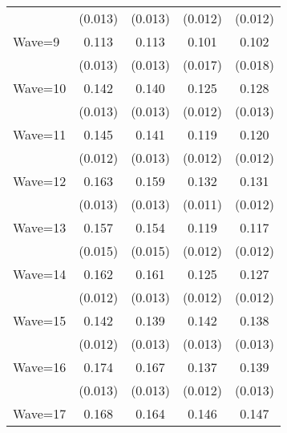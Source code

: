 {\begin{tabular}{l*{4}{c}}
                    &     (0.013)         &     (0.013)         &     (0.012)         &     (0.012)         \\
Wave=9              &       0.113\sym{***}&       0.113\sym{***}&       0.101\sym{***}&       0.102\sym{***}\\
                    &     (0.013)         &     (0.013)         &     (0.017)         &     (0.018)         \\
Wave=10             &       0.142\sym{***}&       0.140\sym{***}&       0.125\sym{***}&       0.128\sym{***}\\
                    &     (0.013)         &     (0.013)         &     (0.012)         &     (0.013)         \\
Wave=11             &       0.145\sym{***}&       0.141\sym{***}&       0.119\sym{***}&       0.120\sym{***}\\
                    &     (0.012)         &     (0.013)         &     (0.012)         &     (0.012)         \\
Wave=12             &       0.163\sym{***}&       0.159\sym{***}&       0.132\sym{***}&       0.131\sym{***}\\
                    &     (0.013)         &     (0.013)         &     (0.011)         &     (0.012)         \\
Wave=13             &       0.157\sym{***}&       0.154\sym{***}&       0.119\sym{***}&       0.117\sym{***}\\
                    &     (0.015)         &     (0.015)         &     (0.012)         &     (0.012)         \\
Wave=14             &       0.162\sym{***}&       0.161\sym{***}&       0.125\sym{***}&       0.127\sym{***}\\
                    &     (0.012)         &     (0.013)         &     (0.012)         &     (0.012)         \\
Wave=15             &       0.142\sym{***}&       0.139\sym{***}&       0.142\sym{***}&       0.138\sym{***}\\
                    &     (0.012)         &     (0.013)         &     (0.013)         &     (0.013)         \\
Wave=16             &       0.174\sym{***}&       0.167\sym{***}&       0.137\sym{***}&       0.139\sym{***}\\
                    &     (0.013)         &     (0.013)         &     (0.012)         &     (0.013)         \\
Wave=17             &       0.168\sym{***}&       0.164\sym{***}&       0.146\sym{***}&       0.147\sym{***}\\

\end{tabular}}
